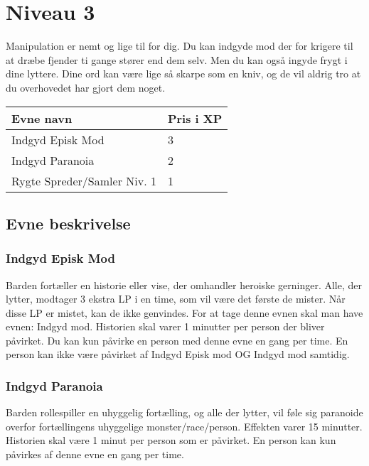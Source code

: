 \chapter*{Niveau 3}
Manipulation er nemt og lige til for dig. Du kan indgyde mod der for krigere til at dræbe fjender ti gange stører end dem selv. Men du kan også ingyde frygt i dine lyttere. Dine ord kan være lige så skarpe som en kniv, og de vil aldrig tro at du overhovedet har gjort dem noget.

\begin{table}[H]
    \centering
    \begin{tabular}{|p{}|p{}|}
    \rowcolor{cerulean!80}\hline
        Evne navn & Pris i XP \\\hline
        Indgyd Episk Mod &3\\\hline
        Indgyd Paranoia &2\\\hline
        Rygte Spreder/Samler Niv. 1 &1\\\hline
    \end{tabular}
\end{table}
\section*{Evne beskrivelse}

\subsection*{Indgyd Episk Mod}
Barden fortæller en historie eller vise, der omhandler heroiske gerninger. Alle, der lytter, modtager 3 ekstra LP i en time, som vil være det første de mister. Når disse LP er mistet, kan de ikke genvindes. For at tage denne evnen skal man have evnen: Indgyd mod. Historien skal varer 1 minutter per person der bliver påvirket. Du kan kun påvirke en person med denne evne en gang per time. En person kan ikke være påvirket af Indgyd Episk mod OG Indgyd mod samtidig.

\subsection*{Indgyd Paranoia}
Barden rollespiller en uhyggelig fortælling, og alle der lytter, vil føle sig paranoide overfor fortællingens uhyggelige monster/race/person. Effekten varer 15 minutter. Historien skal være 1 minut per person som er påvirket. En person kan kun påvirkes af denne evne en gang per time.

